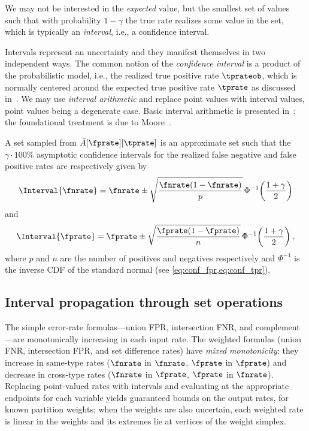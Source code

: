 We may not be interested in the \emph{expected} value, but the smallest set of values such that with probability $1-\gamma$ the true rate
realizes some value in the set, which is typically an \emph{interval}, i.e., a confidence interval.

Intervals represent an uncertainty and they manifest themselves in two independent ways.
The common notion of the \emph{confidence interval} is a product of the probabilistic model, i.e., the realized true positive rate $\tprateob$, which is normally centered around the expected true positive rate $\tprate$ as discussed in~\cite{bernoulliSets}.
We may use \emph{interval arithmetic} and replace point values with interval values, point values being a degenerate case.
Basic interval arithmetic is presented in~\cite{basicinterval}; the foundational treatment is due to Moore~\cite{mooreInterval}.

A set sampled from $\tilde{A}[\fprate][\tprate]$ is an approximate set such that the $\gamma\cdot 100\%$ asymptotic confidence intervals for the realized false negative and false positive rates are respectively given by
\begin{equation}
\Interval{\fnrate} = \fnrate \pm \sqrt{\frac{\fnrate(1-\fnrate)}{p}}\, \Phi^{-1}\!\left(\frac{1+\gamma}{2}\right)
\end{equation}
and
\begin{equation}
\Interval{\fprate} = \fprate \pm \sqrt{\frac{\fprate(1-\fprate)}{n}}\, \Phi^{-1}\!\left(\frac{1+\gamma}{2}\right),
\end{equation}
where $p$ and $n$ are the number of positives and negatives respectively and $\Phi^{-1}$ is the inverse CDF of the standard normal (see \cref{eq:conf_fpr,eq:conf_tpr}).

\subsection{Interval propagation through set operations}

The simple error-rate formulas---union FPR, intersection FNR, and complement---are monotonically increasing in each input rate.
The weighted formulas (union FNR, intersection FPR, and set difference rates) have \emph{mixed monotonicity}: they increase in same-type rates ($\fnrate$ in $\fnrate$, $\fprate$ in $\fprate$) and decrease in cross-type rates ($\fnrate$ in $\fprate$, $\fprate$ in $\fnrate$).
Replacing point-valued rates with intervals and evaluating at the appropriate endpoints for each variable yields guaranteed bounds on the output rates, for known partition weights; when the weights are also uncertain, each weighted rate is linear in the weights and its extremes lie at vertices of the weight simplex.

